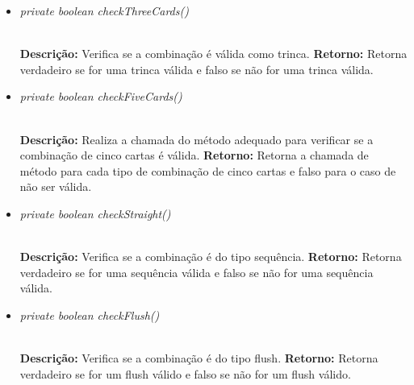 \documentclass[12pt]{article}
\begin{document}
\vspace{0.2 true cm}

\begin{itemize}
\item \begin{large}\textit{private boolean checkThreeCards()}\end{large}\\
\subitem \textbf{Descrição:} Verifica se a combinação é válida como trinca.
\subitem \textbf{Retorno:} Retorna verdadeiro se for uma trinca válida e falso se não for uma trinca válida.
\end{itemize}

\vspace{0.2 true cm}

\begin{itemize}
\item \begin{large}\textit{private boolean checkFiveCards()}\end{large}\\
\subitem \textbf{Descrição:} Realiza a chamada do método adequado para verificar se a combinação de cinco cartas é válida.
\subitem \textbf{Retorno:} Retorna a chamada de método para cada tipo de combinação de cinco cartas e falso para o caso de não ser válida.
\end{itemize}

\vspace{0.2 true cm}

\begin{itemize}
\item \begin{large}\textit{private boolean checkStraight()}\end{large}\\
\subitem \textbf{Descrição:} Verifica se a combinação é do tipo sequência.
\subitem \textbf{Retorno:} Retorna verdadeiro se for uma sequência válida e falso se não for uma sequência válida.
\end{itemize}

\vspace{0.2 true cm}

\begin{itemize}
\item \begin{large}\textit{private boolean checkFlush()}\end{large}\\
\subitem \textbf{Descrição:} Verifica se a combinação é do tipo flush.
\subitem \textbf{Retorno:} Retorna verdadeiro se for um flush válido e falso se não for um flush válido.
\end{itemize}
\end{document}
